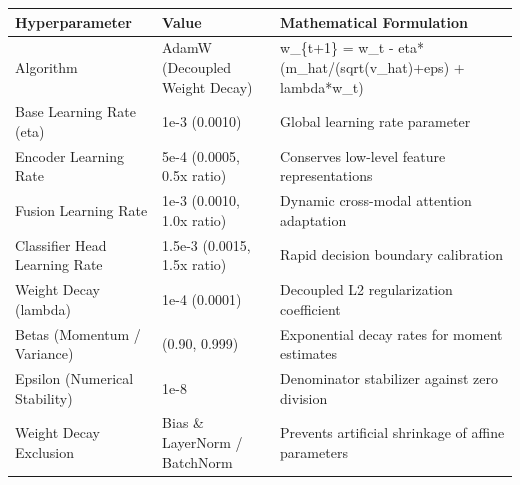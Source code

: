 \begin{tabular}{lll}
\toprule
Hyperparameter & Value & Mathematical Formulation \\
\midrule
Algorithm & AdamW (Decoupled Weight Decay) & w\_\{t+1\} = w\_t - eta*(m\_hat/(sqrt(v\_hat)+eps) + lambda*w\_t) \\
Base Learning Rate (eta) & 1e-3 (0.0010) & Global learning rate parameter \\
Encoder Learning Rate & 5e-4 (0.0005, 0.5x ratio) & Conserves low-level feature representations \\
Fusion Learning Rate & 1e-3 (0.0010, 1.0x ratio) & Dynamic cross-modal attention adaptation \\
Classifier Head Learning Rate & 1.5e-3 (0.0015, 1.5x ratio) & Rapid decision boundary calibration \\
Weight Decay (lambda) & 1e-4 (0.0001) & Decoupled L2 regularization coefficient \\
Betas (Momentum / Variance) & (0.90, 0.999) & Exponential decay rates for moment estimates \\
Epsilon (Numerical Stability) & 1e-8 & Denominator stabilizer against zero division \\
Weight Decay Exclusion & Bias \& LayerNorm / BatchNorm & Prevents artificial shrinkage of affine parameters \\
\bottomrule
\end{tabular}

